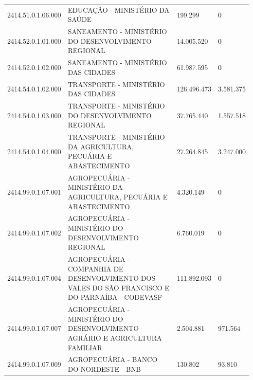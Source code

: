 \documentclass{article}
\begin{document}
\begin{longtable}[c]{m{2cm}|m{11cm}|m{2cm}m{2cm}}
\multicolumn{1}{C{2cm}|}{2414.51.0.1.06.000} & \multicolumn{1}{L{11cm}|}{EDUCAÇÃO - MINISTÉRIO DA SAÚDE} & \multicolumn{1}{R{2cm}|}{199.299} & \multicolumn{1}{R{2cm}}{            0} \\
\multicolumn{1}{C{2cm}|}{2414.52.0.1.01.000} & \multicolumn{1}{L{11cm}|}{SANEAMENTO - MINISTÉRIO DO DESENVOLVIMENTO REGIONAL} & \multicolumn{1}{R{2cm}|}{14.005.520} & \multicolumn{1}{R{2cm}}{            0} \\
\multicolumn{1}{C{2cm}|}{2414.52.0.1.02.000} & \multicolumn{1}{L{11cm}|}{SANEAMENTO - MINISTÉRIO DAS CIDADES} & \multicolumn{1}{R{2cm}|}{61.987.595} & \multicolumn{1}{R{2cm}}{            0} \\
\multicolumn{1}{C{2cm}|}{2414.54.0.1.02.000} & \multicolumn{1}{L{11cm}|}{TRANSPORTE - MINISTÉRIO DAS CIDADES} & \multicolumn{1}{R{2cm}|}{126.496.473} & \multicolumn{1}{R{2cm}}{3.581.375} \\
\multicolumn{1}{C{2cm}|}{2414.54.0.1.03.000} & \multicolumn{1}{L{11cm}|}{TRANSPORTE - MINISTÉRIO DO DESENVOLVIMENTO REGIONAL} & \multicolumn{1}{R{2cm}|}{37.765.440} & \multicolumn{1}{R{2cm}}{1.557.518} \\
\multicolumn{1}{C{2cm}|}{2414.54.0.1.04.000} & \multicolumn{1}{L{11cm}|}{TRANSPORTE - MINISTÉRIO DA AGRICULTURA, PECUÁRIA E ABASTECIMENTO} & \multicolumn{1}{R{2cm}|}{27.264.845} & \multicolumn{1}{R{2cm}}{3.247.000} \\
\multicolumn{1}{C{2cm}|}{2414.99.0.1.07.001} & \multicolumn{1}{L{11cm}|}{AGROPECUÁRIA - MINISTÉRIO DA AGRICULTURA, PECUÁRIA E ABASTECIMENTO} & \multicolumn{1}{R{2cm}|}{4.320.149} & \multicolumn{1}{R{2cm}}{            0} \\
\multicolumn{1}{C{2cm}|}{2414.99.0.1.07.002} & \multicolumn{1}{L{11cm}|}{AGROPECUÁRIA - MINISTÉRIO DO DESENVOLVIMENTO REGIONAL} & \multicolumn{1}{R{2cm}|}{6.760.019} & \multicolumn{1}{R{2cm}}{            0} \\
\multicolumn{1}{C{2cm}|}{2414.99.0.1.07.004} & \multicolumn{1}{L{11cm}|}{AGROPECUÁRIA - COMPANHIA DE DESENVOLVIMENTO DOS VALES DO SÃO FRANCISCO E DO PARNAÍBA - CODEVASF} & \multicolumn{1}{R{2cm}|}{111.892.093} & \multicolumn{1}{R{2cm}}{            0} \\
\multicolumn{1}{C{2cm}|}{2414.99.0.1.07.007} & \multicolumn{1}{L{11cm}|}{AGROPECUÁRIA - MINISTÉRIO DO DESENVOLVIMENTO AGRÁRIO E AGRICULTURA FAMILIAR} & \multicolumn{1}{R{2cm}|}{2.504.881} & \multicolumn{1}{R{2cm}}{971.564} \\
\multicolumn{1}{C{2cm}|}{2414.99.0.1.07.009} & \multicolumn{1}{L{11cm}|}{AGROPECUÁRIA - BANCO DO NORDESTE - BNB} & \multicolumn{1}{R{2cm}|}{130.802} & \multicolumn{1}{R{2cm}}{93.810} \\

\end{longtable}
\end{document}
